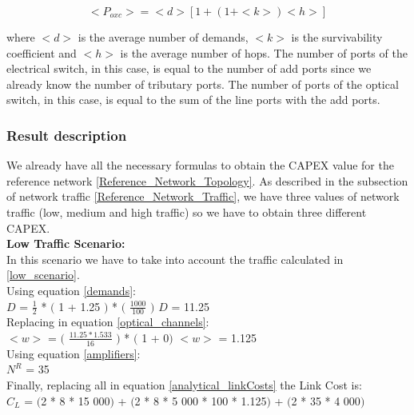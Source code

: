 \begin{equation}
<P_{oxc}> = <d> [1 + \left(1 + <k>\right) <h>]
\label{Poxc_transp}
\end{equation}

\vspace{11pt}
\noindent
where $<d>$ is the average number of demands, $<k>$	is the survivability coefficient and $<h>$ is the average number of hops. The number of ports of the electrical switch, in this case, is equal to the number of add ports since we already know the number of tributary ports. The number of ports of the optical switch, in this case, is equal to the sum of the line ports with the add ports.\\


\subsubsection{Result description}

We already have all the necessary formulas to obtain the CAPEX value for the reference network \ref{Reference_Network_Topology}. As described in the subsection of network traffic \ref{Reference_Network_Traffic}, we have three values of network traffic (low, medium and high traffic) so we have to obtain three different CAPEX.\\
\newpage
\textbf{Low Traffic Scenario:}\\
In this scenario we have to take into account the traffic calculated in \ref{low_scenario}.\\

Using equation \ref{demands}:\\

$D$ = $\frac{1}{2}$ * $($ 1 + 1.25 $)$ * $($ $\frac{1000}{100}$ $)$ \qquad \qquad $D$ = 11.25\\

Replacing in equation \ref{optical_channels}:\\

$<w>$ = $($ $\frac{11.25 * 1.533}{16}$ $)$ * $($ 1 + 0$)$ \qquad \qquad $<w>$ = 1.125\\

Using equation \ref{amplifiers}:\\

$N^R$ = 35\\

Finally, replacing all in equation \ref{analytical_linkCosts} the Link Cost is:\\

$C_L$ = $($2 * 8 * 15 000$)$ + $($2 * 8 * 5 000 * 100 * 1.125$)$ + $($2 * 35 * 4 000$)$\\

